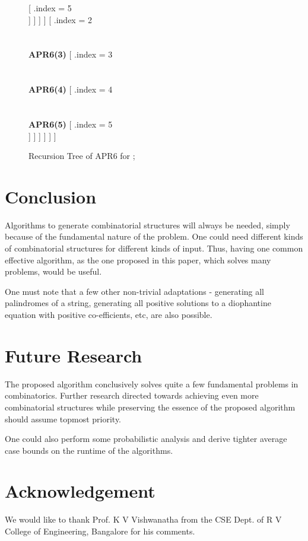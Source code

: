 \documentclass{article}
\begin{document}
\begin{figure*}[!htp]
{					[
						.{index = 5 \\ \fbox{}}
					]
				] 
			]
		]
		[
			.{index = 2 \\  \\  \\ \textbf{APR6(3)}}
			[
				.{index = 3 \\  \\  \\ \textbf{APR6(4)}} 
				[
					.{index = 4 \\  \\  \\ \textbf{APR6(5)}}
					[
						.{index = 5 \\ \fbox{}}
					]
				] 
			]
		]
	]
]}
\caption{Recursion Tree of APR6 for ; }
\label{fig:compositions}
\end{figure*}

\section{Conclusion}
\label{sec:conc}

Algorithms to generate combinatorial structures will always be needed, simply because of the fundamental nature of the problem. One could need different kinds of combinatorial structures for different kinds of input. Thus, having one common effective algorithm, as the one proposed in this paper, which solves many problems, would be useful.

One must note that a few other non-trivial adaptations - generating all palindromes of a string, generating all positive solutions to a diophantine equation with positive co-efficients, etc, are also possible.

\section{Future Research}
\label{sec:future}

The proposed algorithm conclusively solves quite a few fundamental problems in combinatorics. Further research directed towards achieving even more combinatorial structures while preserving the essence of the proposed algorithm should assume topmost priority.

One could also perform some probabilistic analysis and derive tighter average case bounds on the runtime of the algorithms.

\section*{Acknowledgement}

We would like to thank Prof. K V Vishwanatha from the CSE Dept. of R V College of Engineering, Bangalore for his comments.



\label{lastpage}
\end{document}
